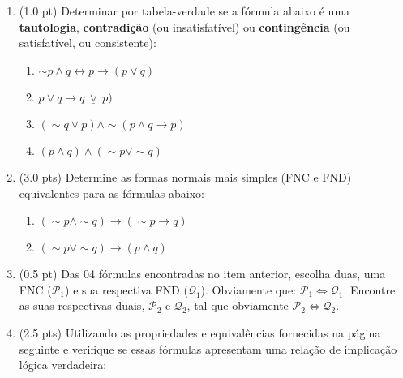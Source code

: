 \documentclass[12pt]{article}
\begin{document}
\begin{enumerate}
\itemsep 15pt
\item (1.0 pt) Determinar por tabela-verdade se a fórmula abaixo é uma {\bf tautologia}, {\bf contradição} (ou insatisfatível) ou {\bf contingência} (ou satisfatível, ou consistente): 

\begin{enumerate}
\setlength{\itemsep}{-2pt}
\item $\sim p \wedge q \leftrightarrow p \rightarrow (p \vee q) $

\item $p \vee q \rightarrow q ~\underline{\vee}~ p)$

\item $ (\sim q \vee p) \wedge \sim (p \wedge q \rightarrow p) $ 

\item $(p \wedge q) \wedge (\sim p \vee \sim q)$ %

\end{enumerate}


\item (3.0 pts) Determine as formas normais \underline{mais simples} (FNC e FND) equivalentes para as fórmulas abaixo: 

\begin{enumerate}
\setlength{\itemsep}{-2pt}


\item $(\sim p \wedge \sim q) \rightarrow (\sim p \rightarrow  q)$


\item $(\sim p \vee \sim q) \rightarrow (p \wedge  q) $

\end{enumerate}

\item (0.5 pt) Das 04 fórmulas
encontradas no item anterior, escolha duas, uma 
FNC ($\mathcal{P}_1$) e sua respectiva FND ($\mathcal{Q}_1$). Obviamente que: $\mathcal{P}_1 \Leftrightarrow \mathcal{Q}_1$. 
Encontre as suas respectivas duais,
$\mathcal{P}_2$ e $\mathcal{Q}_2$,  tal que obviamente 
$\mathcal{P}_2 \Leftrightarrow \mathcal{Q}_2$.


\item (2.5 pts) Utilizando as propriedades e equivalências
fornecidas na página seguinte
e verifique  se essas fórmulas apresentam uma relaç\~ao de implicaç\~ao lógica  verdadeira:
\begin{enumerate}
\setlength{\itemsep}{-2pt}


\end{enumerate}
\end{enumerate}
\end{document}

